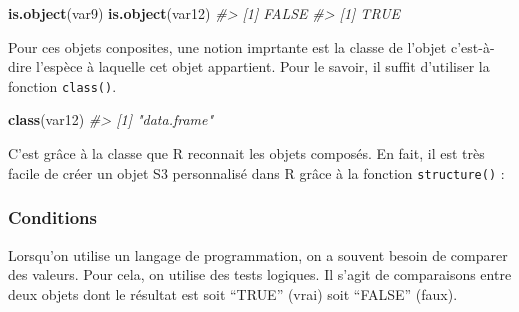 \documentclass[]{article}
\newenvironment{Shaded}{\begin{snugshade}}{\end{snugshade}}
\newcommand{\CommentTok}[1]{\textcolor[rgb]{0.56,0.35,0.01}{\textit{#1}}}
\newcommand{\DataTypeTok}[1]{\textcolor[rgb]{0.13,0.29,0.53}{#1}}
\newcommand{\KeywordTok}[1]{\textcolor[rgb]{0.13,0.29,0.53}{\textbf{#1}}}
\newcommand{\NormalTok}[1]{#1}
\newcommand{\StringTok}[1]{\textcolor[rgb]{0.31,0.60,0.02}{#1}}
\begin{document}
\begin{Shaded}
\begin{Highlighting}[]
\KeywordTok{is.object}\NormalTok{(var9)}
\KeywordTok{is.object}\NormalTok{(var12)}
\CommentTok{#> [1] FALSE}
\CommentTok{#> [1] TRUE}
\end{Highlighting}
\end{Shaded}

Pour ces objets conposites, une notion imprtante est la classe de l'objet c'est-à-dire l'espèce à laquelle cet objet appartient. Pour le savoir, il suffit d'utiliser la fonction \texttt{class()}.

\begin{Shaded}
\begin{Highlighting}[]
\KeywordTok{class}\NormalTok{(var12)}
\CommentTok{#> [1] "data.frame"}
\end{Highlighting}
\end{Shaded}

C'est grâce à la classe que R reconnait les objets composés. En fait, il est très facile de créer un objet S3 personnalisé dans R grâce à la fonction \texttt{structure()} :

\begin{Shaded}
\end{Shaded}

\hypertarget{conditions}{%
\subsubsection*{Conditions}\label{conditions}}

Lorsqu'on utilise un langage de programmation, on a souvent besoin de comparer des valeurs. Pour cela, on utilise des tests logiques. Il s'agit de comparaisons entre deux objets dont le résultat est soit ``TRUE'' (vrai) soit ``FALSE'' (faux).
\end{document}
